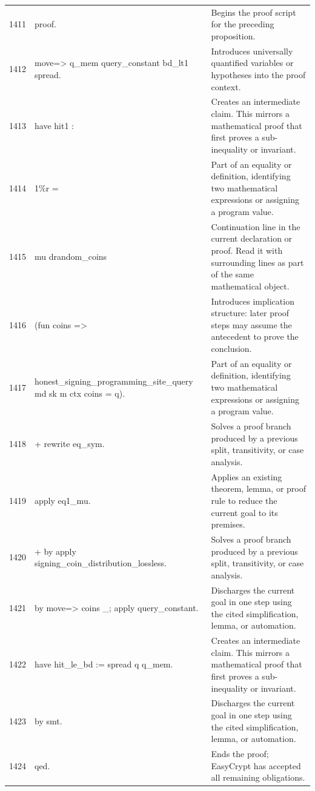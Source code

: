 \documentclass[10pt]{article}
\begin{document}
\begin{longtable}{r L{0.53\textwidth} L{0.37\textwidth}}
1411 & {\ttfamily\scriptsize proof.} & Begins the proof script for the preceding proposition. \\
1412 & {\ttfamily\scriptsize move=> q\_mem query\_constant bd\_lt1 spread.} & Introduces universally quantified variables or hypotheses into the proof context. \\
1413 & {\ttfamily\scriptsize have hit1 :} & Creates an intermediate claim.  This mirrors a mathematical proof that first proves a sub-inequality or invariant. \\
1414 & {\ttfamily\scriptsize   1\%r =} & Part of an equality or definition, identifying two mathematical expressions or assigning a program value. \\
1415 & {\ttfamily\scriptsize   mu drandom\_coins} & Continuation line in the current declaration or proof.  Read it with surrounding lines as part of the same mathematical object. \\
1416 & {\ttfamily\scriptsize     (fun coins =>} & Introduces implication structure: later proof steps may assume the antecedent to prove the conclusion. \\
1417 & {\ttfamily\scriptsize       honest\_signing\_programming\_site\_query md sk m ctx coins = q).} & Part of an equality or definition, identifying two mathematical expressions or assigning a program value. \\
1418 & {\ttfamily\scriptsize + rewrite eq\_sym.} & Solves a proof branch produced by a previous split, transitivity, or case analysis. \\
1419 & {\ttfamily\scriptsize   apply eq1\_mu.} & Applies an existing theorem, lemma, or proof rule to reduce the current goal to its premises. \\
1420 & {\ttfamily\scriptsize   + by apply signing\_coin\_distribution\_lossless.} & Solves a proof branch produced by a previous split, transitivity, or case analysis. \\
1421 & {\ttfamily\scriptsize   by move=> coins \_; apply query\_constant.} & Discharges the current goal in one step using the cited simplification, lemma, or automation. \\
1422 & {\ttfamily\scriptsize have hit\_le\_bd := spread q q\_mem.} & Creates an intermediate claim.  This mirrors a mathematical proof that first proves a sub-inequality or invariant. \\
1423 & {\ttfamily\scriptsize by smt.} & Discharges the current goal in one step using the cited simplification, lemma, or automation. \\
1424 & {\ttfamily\scriptsize qed.} & Ends the proof; EasyCrypt has accepted all remaining obligations. \\

\end{longtable}
\end{document}
